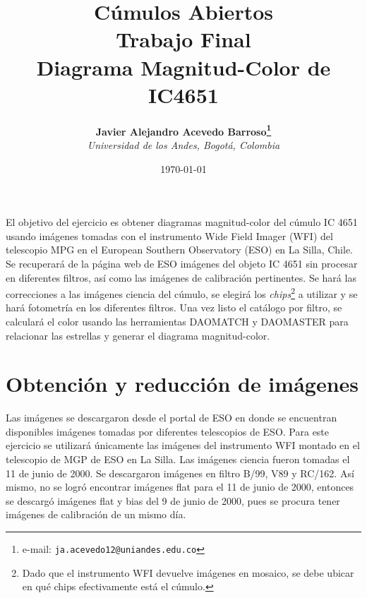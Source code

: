 \documentclass[12pt]{article}
\begin{document}
\title{Cúmulos Abiertos \\ Trabajo Final \\ Diagrama Magnitud-Color de IC4651}

\author{
\textbf{Javier Alejandro Acevedo Barroso\thanks{e-mail: \texttt{ja.acevedo12@uniandes.edu.co}}}\\
\textit{Universidad de los Andes, Bogotá, Colombia}\\
 }%

\date{\today}
\maketitle %


\normalsize
\newpage

El objetivo del ejercicio es obtener diagramas magnitud-color del cúmulo IC 4651 usando imágenes tomadas con el instrumento Wide Field Imager (WFI) del telescopio MPG en el European Southern Observatory (ESO) en La Silla, Chile.
Se recuperará de la página web de ESO imágenes del objeto IC 4651 sin procesar en diferentes filtros, así como las imágenes de calibración pertinentes. 
Se hará las correcciones a las imágenes ciencia del cúmulo, se elegirá los \emph{chips}\footnote{Dado que el instrumento WFI devuelve imágenes en mosaico, se debe ubicar en qué chips efectivamente está el cúmulo.} a utilizar y se hará fotometría en los diferentes filtros.
Una vez listo el catálogo por filtro, se calculará el color usando las herramientas DAOMATCH y DAOMASTER para relacionar las estrellas y generar el diagrama magnitud-color.


\section{Obtención y reducción de imágenes}
Las imágenes se descargaron desde el portal de ESO en donde se encuentran disponibles imágenes tomadas por diferentes telescopios de ESO. Para este ejercicio se utilizará únicamente las imágenes del instrumento WFI montado en el telescopio de MGP de ESO en La Silla. Las imágenes ciencia fueron tomadas el 11 de junio de 2000. Se descargaron imágenes en filtro B/99, V89 y RC/162. Así mismo, no se logró encontrar imágenes flat para el 11 de junio de 2000, entonces se descargó imágenes flat y bias del 9 de junio de 2000, pues se procura tener imágenes de calibración de un mismo día.
\end{document}
